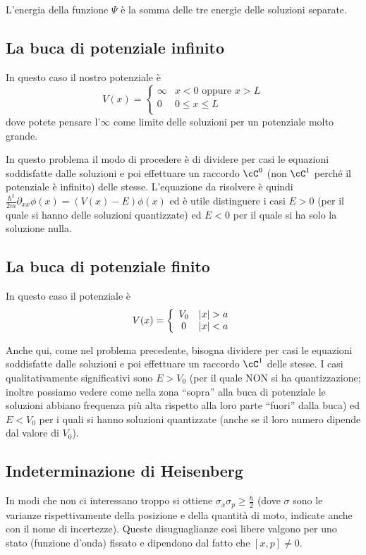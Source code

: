 \documentclass[10pt,a4paper]{article}
\begin{document}
\begin{multicols}{2}
  L'energia della funzione $\Psi$ è la somma delle tre energie delle soluzioni separate.
  
  \subsection*{La buca di potenziale infinito}
  In questo caso il nostro potenziale è
  \begin{displaymath}
    V(x) = \left\{
      \begin{array}{cr}
        \infty & x < 0 \text{ oppure } x > L \\
        0 & 0 \le x \le L \\
      \end{array}
    \right.
  \end{displaymath}
  dove potete pensare l'$\infty$ come limite delle soluzioni per un potenziale molto grande.

  In questo problema il modo di procedere è di dividere per casi le equazioni soddisfatte dalle soluzioni e poi effettuare un raccordo $\cC^0$ (non $\cC^1$ perché il potenziale è infinito) delle stesse. L'equazione da risolvere è quindi $\frac{\hbar^2}{2m} \partial_{xx} \phi(x) = (V(x) - E) \phi(x)$ ed è utile distinguere i casi $E > 0$ (per il quale si hanno delle soluzioni quantizzate) ed $E < 0$ per il quale si ha solo la soluzione nulla.
  
  \subsection*{La buca di potenziale finito}
  In questo caso il potenziale è
  \begin{displaymath}
    V(x) = \left\{
      \begin{array}{cr}
        V_0 & \left|{x}\right| > a \\
        0 & \left|{x}\right| < a \\
      \end{array}
    \right.
  \end{displaymath}

  Anche qui, come nel problema precedente, bisogna dividere per casi le equazioni soddisfatte dalle soluzioni e poi effettuare un raccordo $\cC^1$ delle stesse. I casi qualitativamente significativi sono $E > V_0$ (per il quale NON si ha quantizzazione; inoltre possiamo vedere come nella zona ``sopra'' alla buca di potenziale le soluzioni abbiano frequenza più alta rispetto alla loro parte ``fuori'' dalla buca) ed $E < V_0$ per i quali si hanno soluzioni quantizzate (anche se il loro numero dipende dal valore di $V_0$).
  
  \subsection*{Indeterminazione di Heisenberg}
  In modi che non ci interessano troppo si ottiene $\sigma_x \sigma_p \ge \frac{\hbar}{2}$ (dove $\sigma$ sono le varianze rispettivamente della posizione e della quantità di moto, indicate anche con il nome di incertezze). Queste disuguaglianze così libere valgono per uno stato (funzione d'onda) fissato e dipendono dal fatto che $[x, p] \neq 0$.
  
\end{multicols}
\end{document}
